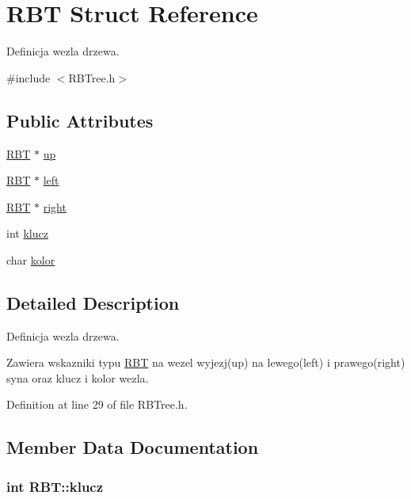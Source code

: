 \hypertarget{struct_r_b_t}{\section{R\-B\-T Struct Reference}
\label{struct_r_b_t}
}


Definicja wezla drzewa.  




{\ttfamily \#include $<$R\-B\-Tree.\-h$>$}

\subsection*{Public Attributes}
\begin{DoxyCompactItemize}
\item 
\hyperlink{struct_r_b_t}{R\-B\-T} $\ast$ \hyperlink{struct_r_b_t_a386eea4c32988a3e82eb145cabc10636}{up}
\item 
\hyperlink{struct_r_b_t}{R\-B\-T} $\ast$ \hyperlink{struct_r_b_t_a3821fe7a316e01824a708ebba5ff7c00}{left}
\item 
\hyperlink{struct_r_b_t}{R\-B\-T} $\ast$ \hyperlink{struct_r_b_t_a4518841b30b0f01bccee73c3266003b3}{right}
\item 
int \hyperlink{struct_r_b_t_a97a4e2ccd2b69c99347c3c48529d8fbe}{klucz}
\item 
char \hyperlink{struct_r_b_t_adf8bfca1acf1ecfbc77a1eeb7006bb80}{kolor}
\end{DoxyCompactItemize}


\subsection{Detailed Description}
Definicja wezla drzewa. 

Zawiera wskazniki typu \hyperlink{struct_r_b_t}{R\-B\-T} na wezel wyjezj(up) na lewego(left) i prawego(right) syna oraz klucz i kolor wezla. 

Definition at line 29 of file R\-B\-Tree.\-h.



\subsection{Member Data Documentation}
\hypertarget{struct_r_b_t_a97a4e2ccd2b69c99347c3c48529d8fbe}{
\subsubsection[{klucz}]{\setlength{\rightskip}{0pt plus 5cm}int R\-B\-T\-::klucz}}\label{struct_r_b_t_a97a4e2ccd2b69c99347c3c48529d8fbe}


